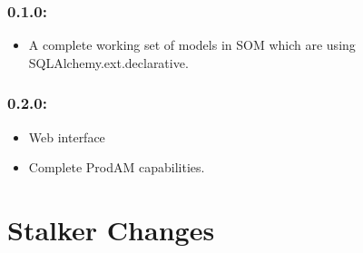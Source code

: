 \documentclass[a4paper,10pt,english]{sphinxmanual}
\begin{document}
\subsection{0.1.0:}
\label{roadmap:id1}\begin{itemize}
\item {} 
A complete working set of models in SOM which are using
SQLAlchemy.ext.declarative.

\end{itemize}


\subsection{0.2.0:}
\label{roadmap:id2}\begin{itemize}
\item {} 
Web interface

\item {} 
Complete ProdAM capabilities.

\end{itemize}


\chapter{Stalker Changes}
\label{changelog:changelog-toplevel}\label{changelog::doc}\label{changelog:stalker-changes}
\end{document}
